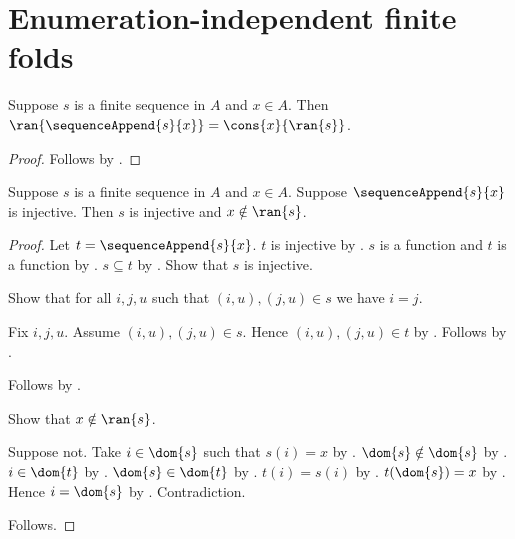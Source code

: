 


\section{Enumeration-independent finite folds}

\begin{proposition}\label{spike_sequence_append_range}
    Suppose $s$ is a finite sequence in $A$ and $x\in A$.
    Then
        $\ran{\sequenceAppend{s}{x}}=\cons{x}{\ran{s}}$.
\end{proposition}
\begin{proof}
    Follows by .
\end{proof}

\begin{proposition}\label{spike_sequence_append_injective_elim}
    Suppose $s$ is a finite sequence in $A$ and $x\in A$.
    Suppose $\sequenceAppend{s}{x}$ is injective.
    Then $s$ is injective and $x\notin\ran{s}$.
\end{proposition}
\begin{proof}
    Let $t=\sequenceAppend{s}{x}$.
    $t$ is injective by \auto.
    $s$ is a function and $t$ is a function by
        .
    $s\subseteq t$ by .
    Show that $s$ is injective.
    \begin{subproof}
        Show that for all $i,j,u$ such that $(i,u),(j,u)\in s$ we have
            $i=j$.
        \begin{subproof}
            Fix $i,j,u$.
            Assume $(i,u),(j,u)\in s$.
            Hence $(i,u),(j,u)\in t$ by .
            Follows by .
        \end{subproof}
        Follows by .
    \end{subproof}
    Show that $x\notin\ran{s}$.
    \begin{subproof}
        Suppose not.
        Take $i\in\dom{s}$ such that $s(i)=x$ by
            .
        $\dom{s}\notin\dom{s}$ by .
        $i\in\dom{t}$ by
            .
        $\dom{s}\in\dom{t}$ by
            .
        $t(i)=s(i)$ by .
        $t(\dom{s})=x$ by .
        Hence $i=\dom{s}$ by .
        Contradiction.
    \end{subproof}
    Follows.
\end{proof}

